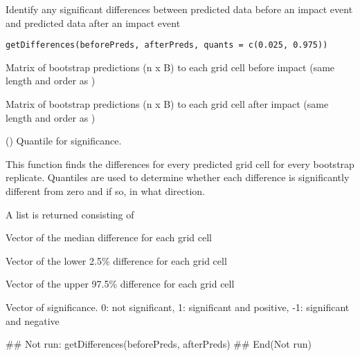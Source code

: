 \documentclass[a4paper]{book}
\begin{document}
%
\begin{Description}\relax
Identify any significant differences between predicted data before an impact event and predicted data after an impact event
\end{Description}
%
\begin{Usage}
\begin{verbatim}
getDifferences(beforePreds, afterPreds, quants = c(0.025, 0.975))
\end{verbatim}
\end{Usage}
%
\begin{Arguments}
\begin{ldescription}
\item[\code{beforePreds}] Matrix of bootstrap predictions (n x B) to each grid cell before impact (same length and order as )

\item[\code{afterPreds}] Matrix of bootstrap predictions (n x B) to each grid cell after impact (same length and order as )

\item[\code{quants}] () Quantile for significance.
\end{ldescription}
\end{Arguments}
%
\begin{Details}\relax
This function finds the differences for every predicted grid cell for every bootstrap replicate.  Quantiles are used to determine whether each difference is significantly different from zero and if so, in what direction.
\end{Details}
%
\begin{Value}
A list is returned consisting of
\begin{ldescription}
\item[\code{mediandiff}] Vector of the median difference for each grid cell
\item[\code{lowerci}] Vector of the lower 2.5\% difference for each grid cell
\item[\code{upperci}] Vector of the upper 97.5\% difference for each grid cell
\item[\code{significanceMarker}] Vector of significance.  0: not significant, 1: significant and positive, -1: significant and negative
\end{ldescription}
\end{Value}
%
\begin{Examples}
\begin{ExampleCode}
 ## Not run: 
getDifferences(beforePreds, afterPreds)
## End(Not run)

\end{ExampleCode}
\end{Examples}
\end{document}
